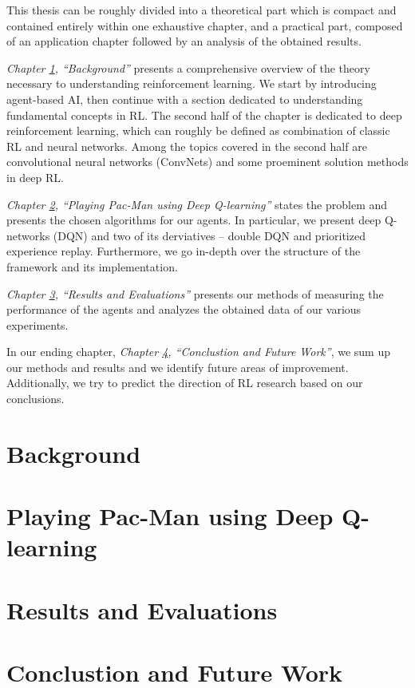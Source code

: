 \documentclass[12pt,twoside]{report}
\begin{document}
This thesis can be roughly divided into a theoretical part which is compact and contained entirely within one exhaustive chapter, and a practical part, composed of an application chapter followed by an analysis of the obtained results.

\emph{Chapter \ref{chapter:background}, ``Background''} presents a comprehensive overview of the theory necessary to understanding reinforcement learning.
We start by introducing agent-based AI, then continue with a
section dedicated to understanding fundamental concepts in RL.
The second half of the chapter is dedicated to deep reinforcement learning, which can roughly be defined as combination of classic RL and neural networks.
Among the topics covered in the second half are convolutional neural networks (ConvNets) and some proeminent solution methods in deep RL.

\emph{Chapter \ref{chapter:practical}, ``Playing Pac-Man using Deep Q-learning''} states the problem and presents the chosen algorithms for our agents.
In particular, we present deep Q-networks (DQN) and two of its derviatives -- double DQN and prioritized experience replay.
Furthermore, we go in-depth over the structure of the framework and its implementation.

\emph{Chapter \ref{chapter:results}, ``Results and Evaluations''} presents our methods of measuring the performance of the agents and analyzes the obtained data of our various experiments.

In our ending chapter, \emph{Chapter \ref{chapter:conclusion}, ``Conclustion and Future Work''}, we sum up our methods and results and we identify future areas of improvement. Additionally, we try to predict the direction of RL research based on our conclusions.

\chapter{Background} \label{chapter:background}


\chapter{Playing Pac-Man using Deep Q-learning} \label{chapter:practical}


\chapter{Results and Evaluations} \label{chapter:results}


\chapter{Conclustion and Future Work} \label{chapter:conclusion}



\end{document}
